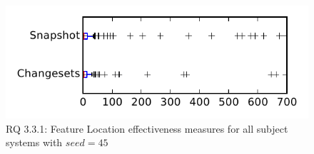 
\begin{figure}
\centering
\includegraphics[height=0.4\textheight]{figures/flt_seed/rq1_tiny_45}
\caption{RQ 3.3.1: Feature Location effectiveness measures for all subject systems with $seed=45$}
\label{fig:flt_seed:rq1:tiny}
\end{figure}
